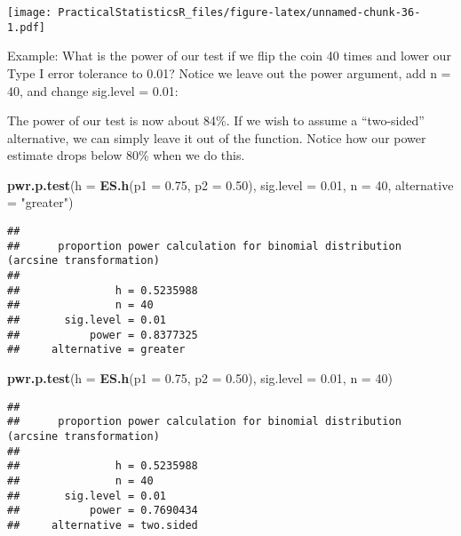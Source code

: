 \documentclass[
]{article}
\newenvironment{Shaded}{\begin{snugshade}}{\end{snugshade}}
\newcommand{\DataTypeTok}[1]{\textcolor[rgb]{0.13,0.29,0.53}{#1}}
\newcommand{\DecValTok}[1]{\textcolor[rgb]{0.00,0.00,0.81}{#1}}
\newcommand{\FloatTok}[1]{\textcolor[rgb]{0.00,0.00,0.81}{#1}}
\newcommand{\KeywordTok}[1]{\textcolor[rgb]{0.13,0.29,0.53}{\textbf{#1}}}
\newcommand{\NormalTok}[1]{#1}
\newcommand{\StringTok}[1]{\textcolor[rgb]{0.31,0.60,0.02}{#1}}
\begin{document}
\texttt{[image: PracticalStatisticsR\_files/figure-latex/unnamed-chunk-36-1.pdf]}

Example: What is the power of our test if we flip the coin 40 times and
lower our Type I error tolerance to 0.01? Notice we leave out the power
argument, add n = 40, and change sig.level = 0.01:

The power of our test is now about 84\%. If we wish to assume a
``two-sided'' alternative, we can simply leave it out of the function.
Notice how our power estimate drops below 80\% when we do this.

\begin{Shaded}
\begin{Highlighting}[]
\KeywordTok{pwr.p.test}\NormalTok{(}\DataTypeTok{h =} \KeywordTok{ES.h}\NormalTok{(}\DataTypeTok{p1 =} \FloatTok{0.75}\NormalTok{, }\DataTypeTok{p2 =} \FloatTok{0.50}\NormalTok{),}
           \DataTypeTok{sig.level =} \FloatTok{0.01}\NormalTok{,}
           \DataTypeTok{n =} \DecValTok{40}\NormalTok{,}
           \DataTypeTok{alternative =} \StringTok{"greater"}\NormalTok{)}
\end{Highlighting}
\end{Shaded}

\begin{verbatim}
## 
##      proportion power calculation for binomial distribution (arcsine transformation) 
## 
##               h = 0.5235988
##               n = 40
##       sig.level = 0.01
##           power = 0.8377325
##     alternative = greater
\end{verbatim}

\begin{Shaded}
\begin{Highlighting}[]
\KeywordTok{pwr.p.test}\NormalTok{(}\DataTypeTok{h =} \KeywordTok{ES.h}\NormalTok{(}\DataTypeTok{p1 =} \FloatTok{0.75}\NormalTok{, }\DataTypeTok{p2 =} \FloatTok{0.50}\NormalTok{),}
           \DataTypeTok{sig.level =} \FloatTok{0.01}\NormalTok{,}
           \DataTypeTok{n =} \DecValTok{40}\NormalTok{)}
\end{Highlighting}
\end{Shaded}

\begin{verbatim}
## 
##      proportion power calculation for binomial distribution (arcsine transformation) 
## 
##               h = 0.5235988
##               n = 40
##       sig.level = 0.01
##           power = 0.7690434
##     alternative = two.sided
\end{verbatim}
\end{document}

